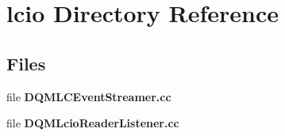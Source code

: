 \section{lcio Directory Reference}
\label{dir_a78a327c511d65cc57dafad1d9fe94da}
\subsection*{Files}
\begin{DoxyCompactItemize}
\item 
file {\bf D\+Q\+M\+L\+C\+Event\+Streamer.\+cc}
\item 
file {\bf D\+Q\+M\+Lcio\+Reader\+Listener.\+cc}
\end{DoxyCompactItemize}
